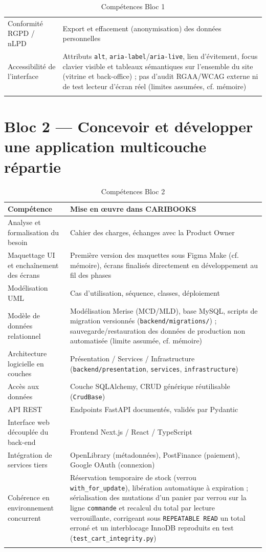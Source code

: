 \documentclass[10pt, a4paper]{article}
\begin{document}
\begin{longtable}{@{}L{6cm}L{9.5cm}@{}}
Conformité RGPD / nLPD & Export et effacement (anonymisation) des données personnelles \\
Accessibilité de l'interface & Attributs \texttt{alt}, \texttt{aria-label}/\texttt{aria-live}, lien d'évitement, focus clavier visible et tableaux sémantiques sur l'ensemble du site (vitrine et back-office) ; pas d'audit RGAA/WCAG externe ni de test lecteur d'écran réel (limites assumées, cf. mémoire) \\
\bottomrule
\caption{Compétences Bloc 1}
\end{longtable}

\section{Bloc 2 — Concevoir et développer une application multicouche répartie}

\begin{longtable}{@{}L{6cm}L{9.5cm}@{}}
\toprule
\textbf{Compétence} & \textbf{Mise en œuvre dans CARIBOOKS} \\
\midrule
\endhead
Analyse et formalisation du besoin & Cahier des charges, échanges avec la Product Owner \\
Maquettage UI et enchaînement des écrans & Première version des maquettes sous Figma Make (cf. mémoire), écrans finalisés directement en développement au fil des phases \\
Modélisation UML & Cas d'utilisation, séquence, classes, déploiement \\
Modèle de données relationnel & Modélisation Merise (MCD/MLD), base MySQL, scripts de migration versionnés (\texttt{backend/migrations/}) ; sauvegarde/restauration des données de production non automatisée (limite assumée, cf. mémoire) \\
Architecture logicielle en couches & Présentation / Services / Infrastructure (\texttt{backend/presentation}, \texttt{services}, \texttt{infrastructure}) \\
Accès aux données & Couche SQLAlchemy, CRUD générique réutilisable (\texttt{CrudBase}) \\
API REST & Endpoints FastAPI documentés, validés par Pydantic \\
Interface web découplée du back-end & Frontend Next.js / React / TypeScript \\
Intégration de services tiers & OpenLibrary (métadonnées), PostFinance (paiement), Google OAuth (connexion) \\
Cohérence en environnement concurrent & Réservation temporaire de stock (verrou \texttt{with\_for\_update}), libération automatique à expiration ; sérialisation des mutations d'un panier par verrou sur la ligne \texttt{commande} et recalcul du total par lecture verrouillante, corrigeant sous \texttt{REPEATABLE READ} un total erroné et un interblocage InnoDB reproduits en test (\texttt{test\_cart\_integrity.py}) \\
\bottomrule
\caption{Compétences Bloc 2}
\end{longtable}
\end{document}

